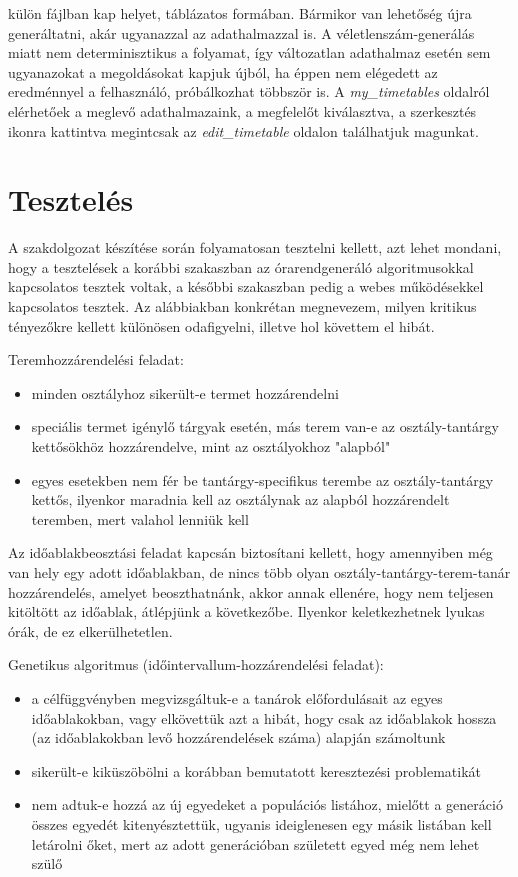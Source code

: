 külön fájlban kap helyet, táblázatos formában. Bármikor van lehetőség újra generáltatni, akár ugyanazzal az adathalmazzal is. A véletlenszám-generálás miatt nem determinisztikus a folyamat, így változatlan adathalmaz esetén sem ugyanazokat a megoldásokat kapjuk újból, ha éppen nem elégedett az eredménnyel a felhasználó, próbálkozhat többször is. A \textit{my\_timetables} oldalról elérhetőek a meglevő adathalmazaink, a megfelelőt kiválasztva, a szerkesztés ikonra kattintva megintcsak az \textit{edit\_timetable} oldalon találhatjuk magunkat.

\section{Tesztelés}

A szakdolgozat készítése során folyamatosan tesztelni kellett, azt lehet mondani, hogy a tesztelések a korábbi szakaszban az órarendgeneráló algoritmusokkal kapcsolatos tesztek voltak, a későbbi szakaszban pedig a webes működésekkel kapcsolatos tesztek. Az alábbiakban konkrétan megnevezem, milyen kritikus tényezőkre kellett különösen odafigyelni, illetve hol követtem el hibát.

Teremhozzárendelési feladat:
\begin{itemize}
\item minden osztályhoz sikerült-e termet hozzárendelni
\item speciális termet igénylő tárgyak esetén, más terem van-e az osztály-tantárgy kettősökhöz hozzárendelve, mint az osztályokhoz "alapból"
\item egyes esetekben nem fér be tantárgy-specifikus terembe az osztály-tantárgy kettős, ilyenkor maradnia kell az osztálynak az alapból hozzárendelt teremben, mert valahol lenniük kell
\end{itemize}

Az időablakbeosztási feladat kapcsán biztosítani kellett, hogy amennyiben még van hely egy adott időablakban, de nincs több olyan osztály-tantárgy-terem-tanár hozzárendelés, amelyet  beoszthatnánk, akkor annak ellenére, hogy nem teljesen kitöltött az időablak, átlépjünk a következőbe. Ilyenkor keletkezhetnek lyukas órák, de ez elkerülhetetlen.

Genetikus algoritmus (időintervallum-hozzárendelési feladat):
\begin{itemize}
\item a célfüggvényben megvizsgáltuk-e a tanárok előfordulásait az egyes időablakokban, vagy elkövettük azt a hibát, hogy csak az időablakok hossza (az időablakokban levő hozzárendelések száma) alapján számoltunk
\item sikerült-e kiküszöbölni a korábban bemutatott keresztezési problematikát
\item nem adtuk-e hozzá az új egyedeket a populációs listához, mielőtt a generáció összes egyedét kitenyésztettük, ugyanis ideiglenesen egy másik listában kell letárolni őket, mert az adott generációban született egyed még nem lehet szülő
\end{itemize}

